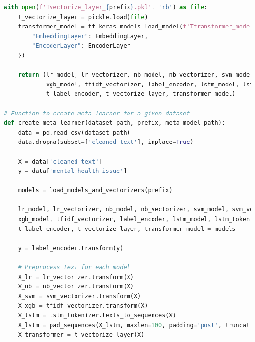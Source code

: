     \begin{tcolorbox}[colback=gray!5!white, colframe=gray!80!black, boxrule=0.5pt, title=Hierarchical Ensemble Model 1] 
        \begin{lstlisting}[language=Python]
    with open(f'Tvectorize_layer_{prefix}.pkl', 'rb') as file:
    t_vectorize_layer = pickle.load(file)
    transformer_model = tf.keras.models.load_model(f'Ttransformer_model_{prefix}.h5', custom_objects={
        "EmbeddingLayer": EmbeddingLayer,
        "EncoderLayer": EncoderLayer
    })

    return (lr_model, lr_vectorizer, nb_model, nb_vectorizer, svm_model, svm_vectorizer,
            xgb_model, tfidf_vectorizer, label_encoder, lstm_model, lstm_tokenizer,
            t_label_encoder, t_vectorize_layer, transformer_model)

# Function to create meta learner for a given dataset
def create_meta_learner(dataset_path, prefix, meta_model_path):
    data = pd.read_csv(dataset_path)
    data.dropna(subset=['cleaned_text'], inplace=True)

    X = data['cleaned_text']
    y = data['mental_health_issue']

    models = load_models_and_vectorizers(prefix)

    lr_model, lr_vectorizer, nb_model, nb_vectorizer, svm_model, svm_vectorizer, \
    xgb_model, tfidf_vectorizer, label_encoder, lstm_model, lstm_tokenizer, \
    t_label_encoder, t_vectorize_layer, transformer_model = models

    y = label_encoder.transform(y)

    # Preprocess text for each model
    X_lr = lr_vectorizer.transform(X)
    X_nb = nb_vectorizer.transform(X)
    X_svm = svm_vectorizer.transform(X)
    X_xgb = tfidf_vectorizer.transform(X)
    X_lstm = lstm_tokenizer.texts_to_sequences(X)
    X_lstm = pad_sequences(X_lstm, maxlen=100, padding='post', truncating='post')
    X_transformer = t_vectorize_layer(X)
\end{lstlisting}
    \end{tcolorbox}
